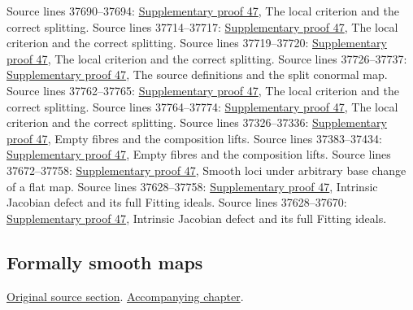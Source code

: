 \begin{AlgebraSourceRoutes}
 Source lines 37690--37694: \hyperlink{algebra_smooth_notes_20260928}{Supplementary proof 47}, The local criterion and the correct splitting.
 Source lines 37714--37717: \hyperlink{algebra_smooth_notes_20260928}{Supplementary proof 47}, The local criterion and the correct splitting.
 Source lines 37719--37720: \hyperlink{algebra_smooth_notes_20260928}{Supplementary proof 47}, The local criterion and the correct splitting.
 Source lines 37726--37737: \hyperlink{algebra_smooth_notes_20260928}{Supplementary proof 47}, The source definitions and the split conormal map.
 Source lines 37762--37765: \hyperlink{algebra_smooth_notes_20260928}{Supplementary proof 47}, The local criterion and the correct splitting.
 Source lines 37764--37774: \hyperlink{algebra_smooth_notes_20260928}{Supplementary proof 47}, The local criterion and the correct splitting.
 Source lines 37326--37336: \hyperlink{algebra_smooth_notes_20260928}{Supplementary proof 47}, Empty fibres and the composition lifts.
 Source lines 37383--37434: \hyperlink{algebra_smooth_notes_20260928}{Supplementary proof 47}, Empty fibres and the composition lifts.
 Source lines 37672--37758: \hyperlink{algebra_smooth_notes_20260928}{Supplementary proof 47}, Smooth loci under arbitrary base change of a flat map.
 Source lines 37628--37758: \hyperlink{algebra_smooth_notes_20260928}{Supplementary proof 47}, Intrinsic Jacobian defect and its full Fitting ideals.
 Source lines 37628--37670: \hyperlink{algebra_smooth_notes_20260928}{Supplementary proof 47}, Intrinsic Jacobian defect and its full Fitting ideals.
\end{AlgebraSourceRoutes}

\subsection{Formally smooth maps}
\hypertarget{algebra-source-section-formally-smooth}{}
\noindent\href{https://github.com/stacks/stacks-project/blob/a04446e57ec1fbc252a871afcec7752fb2807b14/algebra.tex\#L37795}{Original source section}. \href{algebra.pdf\#nameddest=section-formally-smooth}{Accompanying chapter}.

